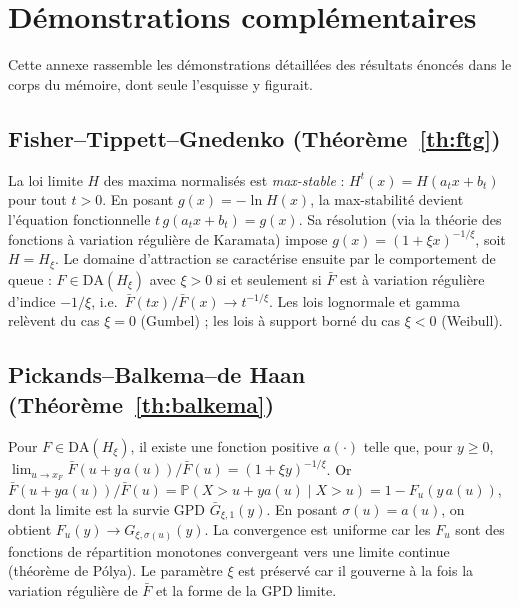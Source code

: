 \documentclass[11pt,a4paper]{article}
\theoremstyle{navystyle}
\theoremstyle{navydef}
\newcommand{\Prob}{\mathbb{P}}
\begin{document}
\vspace{1em}


\appendix
\clearpage
\section{Démonstrations complémentaires}
\label{ann:preuves}

Cette annexe rassemble les démonstrations détaillées des résultats énoncés dans le corps du mémoire, dont seule l'esquisse y figurait.

\subsection{Fisher--Tippett--Gnedenko (Théorème~\ref{th:ftg})}
\label{ann:ftg}
La loi limite $H$ des maxima normalisés est \emph{max-stable} : $H^t(x)=H(a_tx+b_t)$ pour tout $t>0$. En posant $g(x)=-\ln H(x)$, la max-stabilité devient l'équation fonctionnelle $t\,g(a_tx+b_t)=g(x)$. Sa résolution (via la théorie des fonctions à variation régulière de Karamata) impose $g(x)=(1+\xi x)^{-1/\xi}$, soit $H=H_\xi$. Le domaine d'attraction se caractérise ensuite par le comportement de queue : $F\in\mathrm{DA}(H_\xi)$ avec $\xi>0$ si et seulement si $\bar F$ est à variation régulière d'indice $-1/\xi$, i.e.\ $\bar F(tx)/\bar F(x)\to t^{-1/\xi}$. Les lois lognormale et gamma relèvent du cas $\xi=0$ (Gumbel) ; les lois à support borné du cas $\xi<0$ (Weibull).

\subsection{Pickands--Balkema--de Haan (Théorème~\ref{th:balkema})}
\label{ann:balkema}
Pour $F\in\mathrm{DA}(H_\xi)$, il existe une fonction positive $a(\cdot)$ telle que, pour $y\ge0$,
$\lim_{u\to x_F}\bar F(u+y\,a(u))/\bar F(u)=(1+\xi y)^{-1/\xi}$.
Or $\bar F(u+ya(u))/\bar F(u)=\Prob(X>u+ya(u)\mid X>u)=1-F_u(y\,a(u))$, dont la limite est la survie GPD $\bar G_{\xi,1}(y)$. En posant $\sigma(u)=a(u)$, on obtient $F_u(y)\to G_{\xi,\sigma(u)}(y)$. La convergence est uniforme car les $F_u$ sont des fonctions de répartition monotones convergeant vers une limite continue (théorème de Pólya). Le paramètre $\xi$ est préservé car il gouverne à la fois la variation régulière de $\bar F$ et la forme de la GPD limite.
\end{document}
